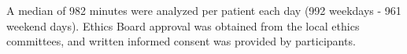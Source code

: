 A median of 982 minutes were analyzed per patient each day (992 weekdays - 961 weekend days).
Ethics Board approval was obtained from the local ethics committees, and written informed consent was provided by participants.\\

%

